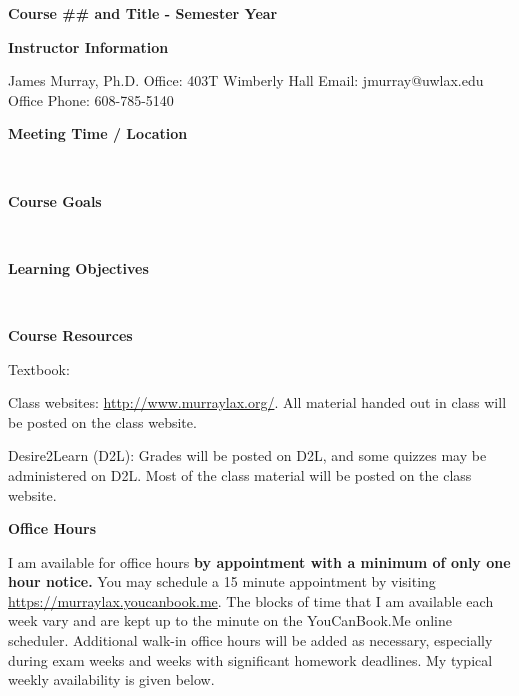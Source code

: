 \documentclass[10pt]{article}
\newcommand{\bulurl}[1]{\url{#1}}
\newcommand{\bd}{\begin{description}}
\newcommand{\ed}{\end{description}}
\newcommand{\toprule}{\par\vspace*{5pt}\noindent{\hrule\hfill}\par\vspace*{1pt}}
\newcommand{\botrule}{\par\noindent{\hrule\hfill}\par}
\begin{document}
\begin{center} 
\textbf{Course \#\# and Title - Semester Year}\\
\end{center} 

\botrule \textbf{Instructor Information} \toprule
James Murray, Ph.D.\newline
Office: 403T Wimberly Hall\newline
Email: jmurray@uwlax.edu\newline
Office Phone: 608-785-5140 \newline

\botrule \textbf{Meeting Time / Location} \toprule
\ \\

\botrule \textbf{Course Goals} \toprule
\ \\

\botrule \textbf{Learning Objectives} \toprule
\ \\

\botrule \textbf{Course Resources} \toprule
\bd
\item Textbook: 
\item Class websites: \bulurl{http://www.murraylax.org/}.  All material handed out in class will be posted on the class website.  
\item Desire2Learn (D2L):  Grades will be posted on D2L, and some quizzes may be administered on D2L.  Most of the class material will be posted on the class website. \\ 
\ed

\botrule \textbf{Office Hours} \toprule
I am available for office hours \textbf{by appointment with a minimum of only one hour notice.}  You may schedule a 15 minute appointment by visiting \bulurl{https://murraylax.youcanbook.me}.  The blocks of time that I am available each week vary and are kept up to the minute on the YouCanBook.Me online scheduler.  Additional walk-in office hours will be added as necessary, especially during exam weeks and weeks with significant homework deadlines.  My typical weekly availability is given below. \\
\end{document}
